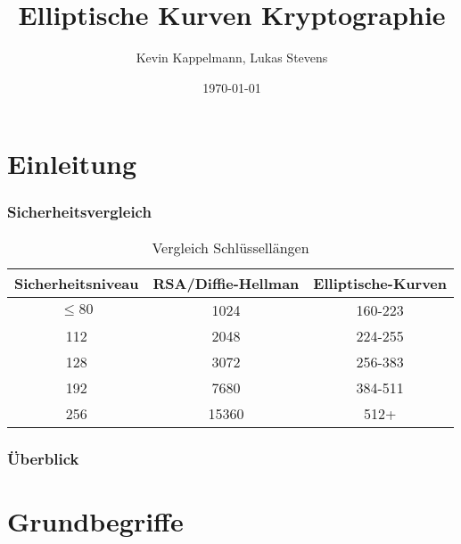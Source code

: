 \documentclass{beamer}
\title[Elliptische-Kurven-Kryptographie]{Elliptische Kurven Kryptographie} %
\author{Kevin Kappelmann, Lukas Stevens} %
\institute[TUM] %
{Technische Universität München \\ %
}
\date{\today} %
\theoremstyle{plain}
\theoremstyle{definition}
\theoremstyle{rem}
\begin{document}
\begin{frame}
\titlepage %
\end{frame}


\section*{Einleitung}

\begin{frame}
\frametitle{Sicherheitsvergleich}
\begin{table}[h]
\centering
	\begin{tabular}{| c | c | c |}
	\hline
	\rowcolor{lightblue}
	Sicherheitsniveau & RSA/Diffie-Hellman & Elliptische-Kurven\\ \hline
	\rowcolor{lightred}
	$\le80$ 	& 1024 & 160-223 \\ \hline
	\rowcolor{lightgreen}
	112 	& 2048 & 224-255 \\ \hline
	\rowcolor{lightgreen}
	128 	& 3072 & 256-383 \\ \hline
	\rowcolor{lightgreen}
	192 	& 7680 & 384-511 \\ \hline
	\rowcolor{lightgreen}
	256 	& 15360 & 512+ \\ \hline
	\end{tabular}
\caption{Vergleich Schlüssellängen}
\end{table}
\end{frame}


\begin{frame}
	\frametitle{Überblick} %
\begin{multicols}{2}
\tableofcontents
\end{multicols}
\end{frame}


\section{Grundbegriffe}
\end{document}

